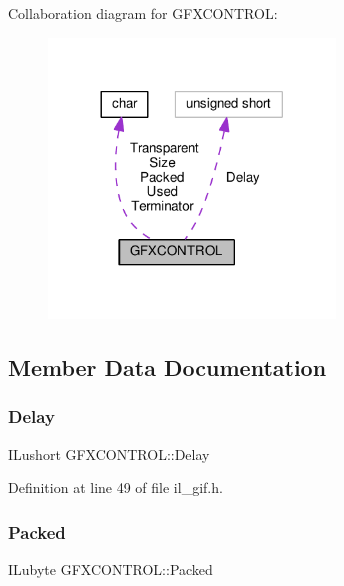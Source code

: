 Collaboration diagram for G\+F\+X\+C\+O\+N\+T\+R\+OL\+:
\nopagebreak
\begin{figure}[H]
\begin{center}
\leavevmode
\includegraphics[width=216pt]{db/da6/structGFXCONTROL__coll__graph}
\end{center}
\end{figure}


\subsection{Member Data Documentation}
\mbox{\label{structGFXCONTROL_a9664b2acbb021cbc6e9a28a485e2af35}} 
\subsubsection{\texorpdfstring{Delay}{Delay}}
{\footnotesize\ttfamily I\+Lushort G\+F\+X\+C\+O\+N\+T\+R\+O\+L\+::\+Delay}



Definition at line 49 of file il\+\_\+gif.\+h.

\mbox{\label{structGFXCONTROL_abacf5a201a230440aab56a77694f8f59}} 
\subsubsection{\texorpdfstring{Packed}{Packed}}
{\footnotesize\ttfamily I\+Lubyte G\+F\+X\+C\+O\+N\+T\+R\+O\+L\+::\+Packed}



